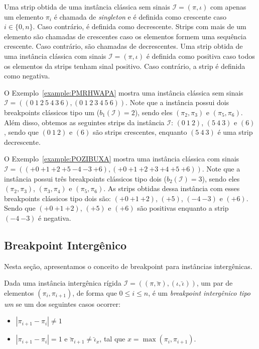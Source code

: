 Uma strip obtida de uma instância clássica sem sinais $\mathcal{I} = (\pi,\iota)$ com apenas um elemento $\pi_i$ é chamada de \emph{singleton} e é definida como crescente caso  $i \in \{0,n\}$. Caso contrário, é definida como decrescente. Strips com mais de um elemento são chamadas de crescentes caso os elementos formem uma sequência crescente. Caso contrário, são chamadas de decrescentes. Uma strip obtida de uma instância clássica com sinais $\mathcal{I} = (\pi,\iota)$ é definida como positiva caso todos os elementos da strips tenham sinal positivo. Caso contrário, a strip é definida como negativa.

O Exemplo~\ref{example:PMRHWAPA} mostra uma instância clássica sem sinais $\mathcal{I} = ((0~1~2~5~4~3~6),\allowbreak(0~1~2~3~4~5~6))$. Note que a instância possui dois breakpoints clássicos tipo um ($b_{1}(\mathcal{I}) = 2$), sendo eles $(\pi_2,\pi_3)$ e $(\pi_5,\pi_6)$. Além disso, obtemos as seguintes strips da instância $\mathcal{I}$: $(0~1~2)$, $(5~4~3)$ e $(6)$, sendo que $(0~1~2)$ e $(6)$ são strips crescentes, enquanto $(5~4~3)$ é uma strip decrescente.



O Exemplo~\ref{example:POZIBUXA} mostra uma instância clássica com sinais $\mathcal{I} = \allowbreak(({+0}~{+1}~{+2}~{+5}~{-4}~{-3}\allowbreak~{+6}),\allowbreak({+0}~{+1}~{+2}~{+3}~{+4}~{+5}~{+6}))$. Note que a instância possui três breakpoints clássicos tipo dois ($b_{2}(\mathcal{I}) = 3$), sendo eles $(\pi_2,\pi_3)$, $(\pi_3,\pi_4)$ e $(\pi_5,\pi_6)$. As strips obtidas dessa instância com esses breakpoints clássicos tipo dois são: $({+0}~{+1}~{+2})$, $({+5})$, $({-4}~{-3})$ e $({+6})$. Sendo que $({+0}~{+1}~{+2})$, $({+5})$ e $({+6})$ são positivas enquanto a strip $({-4}~{-3})$ é negativa.



\subsection{Breakpoint Intergênico}

Nesta seção, apresentamos o conceito de breakpoint para instâncias intergênicas.

\begin{definition}
  Dada uma instância intergênica rígida $\mathcal{I} = ((\pi,\breve\pi),(\iota,\breve\iota))$, um par de elementos $(\pi_{i}, \pi_{i+1})$, de forma que $0 \le i \le n$, é um \emph{breakpoint intergênico tipo um} se um dos seguintes casos ocorrer:
  \begin{itemize}
    \item $|\pi_{i+1} - \pi_{i}| \ne 1$
    \item $|\pi_{i+1} - \pi_{i}| = 1$ e $\breve\pi_{i+1} \ne \breve\iota_{x}$, tal que $x = \max(\pi_{i}, \pi_{i+1})$.
  \end{itemize}
\end{definition}

